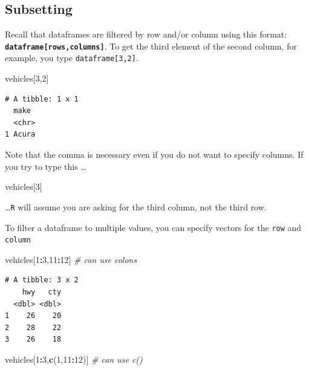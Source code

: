 \documentclass[
]{book}
\newenvironment{Shaded}{\begin{snugshade}}{\end{snugshade}}
\newcommand{\CommentTok}[1]{\textcolor[rgb]{0.56,0.35,0.01}{\textit{#1}}}
\newcommand{\DecValTok}[1]{\textcolor[rgb]{0.00,0.00,0.81}{#1}}
\newcommand{\KeywordTok}[1]{\textcolor[rgb]{0.13,0.29,0.53}{\textbf{#1}}}
\newcommand{\NormalTok}[1]{#1}
\newcommand{\OperatorTok}[1]{\textcolor[rgb]{0.81,0.36,0.00}{\textbf{#1}}}
\begin{document}
\hypertarget{subsetting}{%
\subsection*{Subsetting}\label{subsetting}}

Recall that dataframes are filtered by row and/or column using this format: \textbf{\texttt{dataframe{[}rows,columns{]}}}. To get the third element of the second column, for example, you type \texttt{dataframe{[}3,2{]}}.

\begin{Shaded}
\begin{Highlighting}[]
\NormalTok{vehicles[}\DecValTok{3}\NormalTok{,}\DecValTok{2}\NormalTok{]}
\end{Highlighting}
\end{Shaded}

\begin{verbatim}
# A tibble: 1 x 1
  make 
  <chr>
1 Acura
\end{verbatim}

Note that the comma is necessary even if you do not want to specify columns. If you try to type this \ldots{}

\begin{Shaded}
\begin{Highlighting}[]
\NormalTok{vehicles[}\DecValTok{3}\NormalTok{]}
\end{Highlighting}
\end{Shaded}

\ldots{}\texttt{R} will assume you are asking for the third column, not the third row.

To filter a dataframe to multiple values, you can specify vectors for the \texttt{row} and \texttt{column}

\begin{Shaded}
\begin{Highlighting}[]
\NormalTok{vehicles[}\DecValTok{1}\OperatorTok{:}\DecValTok{3}\NormalTok{,}\DecValTok{11}\OperatorTok{:}\DecValTok{12}\NormalTok{] }\CommentTok{# can use colons}
\end{Highlighting}
\end{Shaded}

\begin{verbatim}
# A tibble: 3 x 2
    hwy   cty
  <dbl> <dbl>
1    26    20
2    28    22
3    26    18
\end{verbatim}

\begin{Shaded}
\begin{Highlighting}[]
\NormalTok{vehicles[}\DecValTok{1}\OperatorTok{:}\DecValTok{3}\NormalTok{,}\KeywordTok{c}\NormalTok{(}\DecValTok{1}\NormalTok{,}\DecValTok{11}\OperatorTok{:}\DecValTok{12}\NormalTok{)]  }\CommentTok{# can use c()}
\end{Highlighting}
\end{Shaded}
\end{document}
